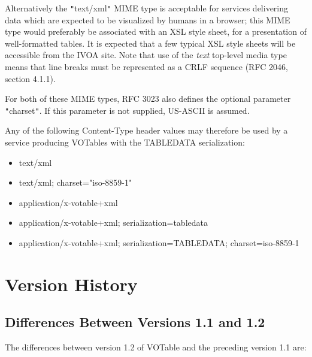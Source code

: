 \documentclass[11pt,a4paper]{ivoa}
\let\fg=\color
\def\literalvalue#1{{\tt"}{{\fg{DarkPurple}#1}}{\tt"}}
\begin{document}
{{{Alternatively the {\literalvalue{\textsf{text/xml}}} MIME type is acceptable
for services delivering data which are expected to be
visualized by humans in a browser; this MIME type
would preferably be associated with an XSL style sheet,
for a presentation of well-formatted tables. It is expected
that a few typical XSL style sheets will be accessible from
the IVOA site.
Note that use of the {\em text} top-level media type means that
line breaks must be represented as a CRLF sequence
(RFC 2046, section 4.1.1).

For both of these MIME types, RFC 3023 also defines the optional
parameter {\literalvalue{\textsf{charset}}}.
If this parameter is not supplied, US-ASCII is assumed.

Any of the following Content-Type header values may therefore be used
by a service producing VOTables with the TABLEDATA serialization:
\begin{itemize}
  \item {\textsf{text/xml}}
  \item {\textsf{text/xml; charset={"}iso-8859-1"}}
  \item {\textsf{application/x-votable+xml}}
  \item {\textsf{application/x-votable+xml; serialization=tabledata}}
  \item {\textsf{application/x-votable+xml; serialization=TABLEDATA; charset=iso-8859-1}}
\end{itemize}


\section{Version History}
\label{diff}

\subsection{Differences Between Versions 1.1 and 1.2}
\label{diff1.1-1.2}
The differences between version 1.2 of VOTable and the preceding
version 1.1 are:

}}}
\end{document}
